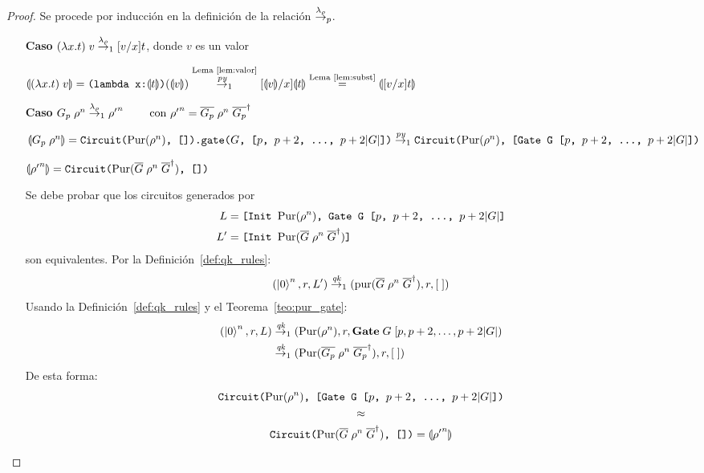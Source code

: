 \begin{proof}
Se procede por inducción en la definición de la relación $\overset{\lambda_\rho}{\rightarrow}_p$.
\begin{itemize}
    \item[\textbf{Caso}] $(\lambda x.t)\;v \overset{\lambda_\rho}{\rightarrow}_1 [v/x]t$, donde $v$ es un valor

$\llparenthesis (\lambda x.t)\;v \rrparenthesis = \texttt{(lambda x:}\llparenthesis t \rrparenthesis\texttt{)}(\llparenthesis v \rrparenthesis) \stackrel{\textrm{Lema~\ref{lem:valor}}}{\overset{\textit{py}}{\rightarrow}_1} [\llparenthesis v \rrparenthesis/x]\llparenthesis t \rrparenthesis  \stackrel{\textrm{Lema~\ref{lem:subst}}}{=} \llparenthesis [v/x]t \rrparenthesis$

    \item[\textbf{Caso}] $G_p\;\rho^n \overset{\lambda_\rho}{\rightarrow}_1 {\rho'}^n \qquad \text{ con }{\rho'}^n = \overline{G_p}\;\rho^n \;\overline{G_p}^\dagger$

\(\llparenthesis G_p\;\rho^n \rrparenthesis =\\
\texttt{Circuit(}\text{Pur}(\rho^n)\texttt{, []).gate(}G\texttt{, [}p\texttt{, }p+2\texttt{, \dots, }p+2|G|\texttt{])} \\
\overset{\textit{py}}{\rightarrow}_1 \texttt{Circuit(}\text{Pur}(\rho^n)\texttt{, [Gate G [}p\texttt{, }p+2\texttt{, \dots, }p+2|G|\texttt{])}\)

$\llparenthesis {\rho'}^n \rrparenthesis = \texttt{Circuit(}\text{Pur}(\overline{G}\;\rho^n \;\overline{G}^\dagger)\texttt{, [])}$

Se debe probar que los circuitos generados por
\begin{align*}
L&=\texttt{[Init }\text{Pur}(\rho^n)\texttt{, Gate G [}p\texttt{, }p+2\texttt{, \dots, }p+2|G|\texttt{]}\\
L'&=\texttt{[Init }\text{Pur}(\overline{G}\;\rho^n \;\overline{G}^\dagger)\texttt{]}
\end{align*}
son equivalentes. Por la Definición~\ref{def:qk_rules}:
\begin{align*}
(\ket{0}^n, r, L') \overset{\textit{qk}}{\rightarrow}_1 (\text{pur}(\overline{G}\;\rho^n \;\overline{G}^\dagger), r, [\;])
\end{align*}
Usando la Definición~\ref{def:qk_rules} y el Teorema~\ref{teo:pur_gate}:
\begin{align*}
    (\ket{0}^n, r, L) &\overset{\textit{qk}}{\rightarrow}_1 (\text{Pur}(\rho^n), r, \textbf{Gate}\;G\;[p, p+2, \dots, p+2|G|) \\
    &\overset{\textit{qk}}{\rightarrow}_1 (\text{Pur}(\overline{G_p}\;\rho^n \;\overline{G_p}^\dagger), r, [\;])
\end{align*}
De esta forma:
\begin{gather*}
\texttt{Circuit(}\text{Pur}(\rho^n)\texttt{, [Gate G [}p\texttt{, }p+2\texttt{, \dots, }p+2|G|\texttt{])} \\
\approx \\
\texttt{Circuit(}\text{Pur}(\overline{G}\;\rho^n \;\overline{G}^\dagger)\texttt{, [])} = \llparenthesis {\rho'}^n \rrparenthesis
\end{gather*}


\end{itemize}
\end{proof}
